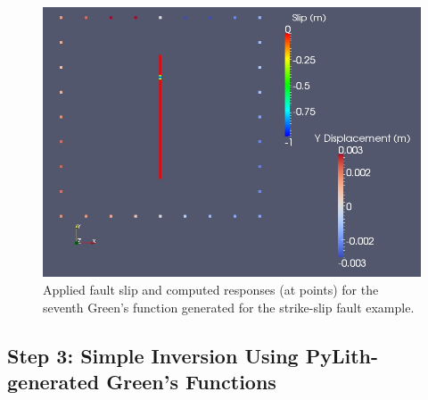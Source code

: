\begin{figure}
  \includegraphics[scale=0.33]{examples/figs/greensfns2d_strikeslip_gf6}
  \caption{Applied fault slip and computed responses (at points) for the seventh
    Green's function generated for the strike-slip fault example.}
  \label{fig:greensfns2d-strikeslip-gf6}
\end{figure}


\subsection{Step 3: Simple Inversion Using PyLith-generated Green's Functions}

